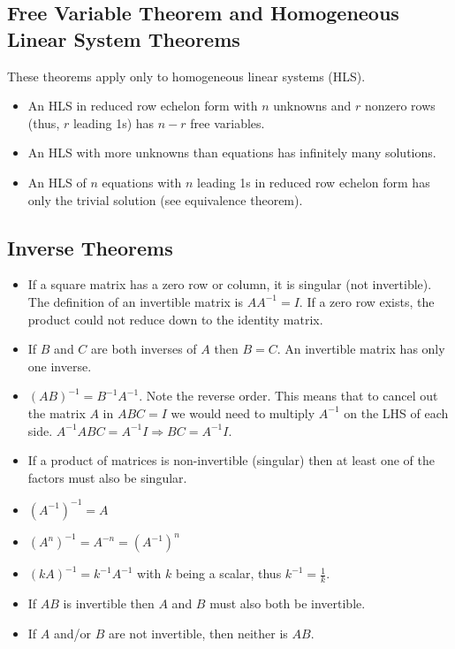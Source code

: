 \documentclass[12pt]{article}
\begin{document}
\subsection{Free Variable Theorem and Homogeneous Linear System Theorems}

These theorems apply only to homogeneous linear systems (HLS).
\begin{itemize}
    \item An HLS in reduced row echelon form with $n$ unknowns and $r$ nonzero rows (thus, $r$ leading 1s) has $n - r$ free variables.
    \item An HLS with more unknowns than equations has infinitely many solutions.
    \item An HLS of $n$ equations with $n$ leading 1s in reduced row echelon form has only the trivial solution (see equivalence theorem).
\end{itemize}


\subsection{Inverse Theorems}

\begin{itemize}
    \item If a square matrix has a zero row or column, it is singular (not invertible). The definition of an invertible matrix is $AA^{-1} = I$. If a zero row exists, the product could not reduce down to the identity matrix.
    \item If $B$ and $C$ are both inverses of $A$ then $B = C$. An invertible matrix has only one inverse.
    \item $(AB)^{-1} = B^{-1}A^{-1}$. Note the reverse order. This means that to cancel out the matrix $A$ in $ABC = I$ we would need to multiply $A^{-1}$ on the LHS of each side. $A^{-1}ABC = A^{-1}I \Rightarrow BC = A^{-1}I$.
    \item If a product of matrices is non-invertible (singular) then at least one of the factors must also be singular.
    \item $(A^{-1})^{-1} = A$
    \item $(A^n)^{-1} = A^{-n} = (A^{-1})^n$
    \item $(kA)^{-1} = k^{-1}A^{-1}$ with $k$ being a scalar, thus $k^{-1} = \frac{1}{k}$.
    \item If $AB$ is invertible then $A$ and $B$ must also both be invertible.
    \item If $A$ and/or $B$ are not invertible, then neither is $AB$.
\end{itemize}
\end{document}
